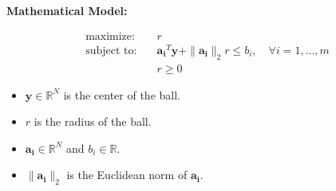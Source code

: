 \documentclass{article}
\begin{document}
\textbf{Mathematical Model:}

\begin{align*}
\text{maximize:} \quad & r \\
\text{subject to:} \quad & \mathbf{a_i}^T \mathbf{y} + \|\mathbf{a_i}\|_2 r \leq b_i, \quad \forall i = 1, \ldots, m \\
\quad & r \geq 0
\end{align*}

\begin{itemize}
    \item \( \mathbf{y} \in \mathbb{R}^N \) is the center of the ball.
    \item \( r \) is the radius of the ball.
    \item \( \mathbf{a_i} \in \mathbb{R}^N \) and \( b_i \in \mathbb{R} \).
    \item \( \|\mathbf{a_i}\|_2 \) is the Euclidean norm of \( \mathbf{a_i} \).
\end{itemize}
\end{document}
